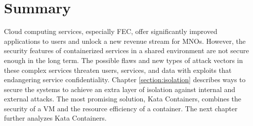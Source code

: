 \section{Summary}

Cloud computing services, especially FEC, offer significantly improved applications to users and unlock a new revenue stream for MNOs. However, the security features of containerized services in a shared environment are not secure enough in the long term. The possible flaws and new types of attack vectors in these complex services threaten users, services, and data with exploits that endangering service confidentiality. Chapter \ref{section:isolation} describes ways to secure the systems to achieve an extra layer of isolation against internal and external attacks. The most promising solution, Kata Containers, combines the security of a VM and the resource efficiency of a container. The next chapter further analyzes Kata Containers.






